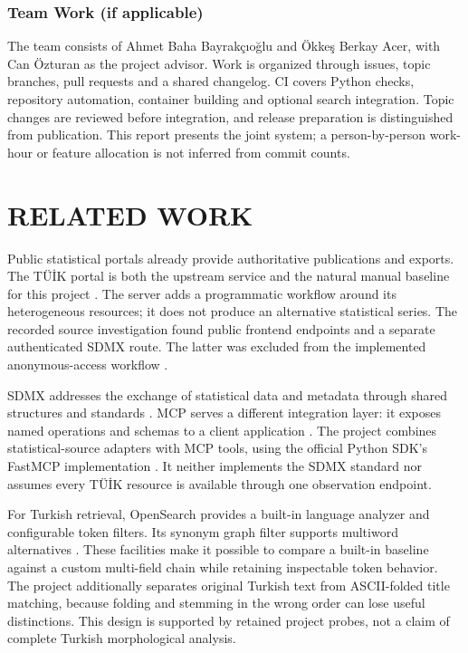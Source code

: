 \documentclass[a4paper,12pt]{report}
\newcommand{\tuik}{T\"U\.{I}K}
\newcommand{\studentone}{Ahmet Baha Bayrakçıoğlu}
\newcommand{\studenttwo}{Ökkeş Berkay Acer}
\newcommand{\projectadvisor}{Can Özturan}
\begin{document}
\subsection{Team Work (if applicable)}
The team consists of \studentone{} and \studenttwo{}, with \projectadvisor{} as the project advisor. Work is organized through issues, topic branches, pull requests and a shared changelog. CI covers Python checks, repository automation, container building and optional search integration. Topic changes are reviewed before integration, and release preparation is distinguished from publication. This report presents the joint system; a person-by-person work-hour or feature allocation is not inferred from commit counts.

\chapter{RELATED WORK}
Public statistical portals already provide authoritative publications and exports. The \tuik{} portal is both the upstream service and the natural manual baseline for this project \cite{tuik-portal}. The server adds a programmatic workflow around its heterogeneous resources; it does not produce an alternative statistical series. The recorded source investigation found public frontend endpoints and a separate authenticated SDMX route. The latter was excluded from the implemented anonymous-access workflow \cite{source-investigation}.

SDMX addresses the exchange of statistical data and metadata through shared structures and standards \cite{sdmx}. MCP serves a different integration layer: it exposes named operations and schemas to a client application \cite{mcp-tools}. The project combines statistical-source adapters with MCP tools, using the official Python SDK's FastMCP implementation \cite{mcp-sdk}. It neither implements the SDMX standard nor assumes every \tuik{} resource is available through one observation endpoint.

For Turkish retrieval, OpenSearch provides a built-in language analyzer and configurable token filters. Its synonym graph filter supports multiword alternatives \cite{os-turkish,os-synonyms}. These facilities make it possible to compare a built-in baseline against a custom multi-field chain while retaining inspectable token behavior. The project additionally separates original Turkish text from ASCII-folded title matching, because folding and stemming in the wrong order can lose useful distinctions. This design is supported by retained project probes, not a claim of complete Turkish morphological analysis.
\end{document}
